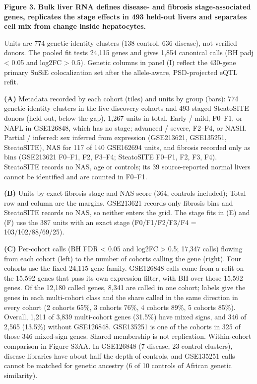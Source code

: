 \textbf{Figure 3. Bulk liver RNA defines disease- and fibrosis stage-associated genes, replicates the stage effects in 493 held-out livers and separates cell mix from change inside hepatocytes.}

Units are 774 genetic-identity clusters (138 control, 636 disease), not verified donors. The pooled fit tests 24,115 genes and gives 1,854 canonical calls (BH padj \textless{} 0.05 and \textbar log2FC\textbar{} \textgreater{} 0.5). Genetic columns in panel (I) reflect the 430-gene primary SuSiE colocalization set after the allele-aware, PSD-projected eQTL refit.

\textbf{(A)} Metadata recorded by each cohort (tiles) and units by group (bars): 774 genetic-identity clusters in the five discovery cohorts and 493 staged SteatoSITE donors (held out, below the gap), 1,267 units in total. Early / mild, F0--F1, or NAFL in GSE126848, which has no stage; advanced / severe, F2--F4, or NASH. Partial / inferred: sex inferred from expression (GSE213621, GSE135251, SteatoSITE), NAS for 117 of 140 GSE162694 units, and fibrosis recorded only as bins (GSE213621 F0--F1, F2, F3--F4; SteatoSITE F0--F1, F2, F3, F4). SteatoSITE records no NAS, age or controls; its 39 source-reported normal livers cannot be identified and are counted in F0--F1.

\textbf{(B)} Units by exact fibrosis stage and NAS score (364, controls included); Total row and column are the margins. GSE213621 records only fibrosis bins and SteatoSITE records no NAS, so neither enters the grid. The stage fits in (E) and (F) use the 387 units with an exact stage (F0/F1/F2/F3/F4 = 103/102/88/69/25).

\textbf{(C)} Per-cohort calls (BH FDR \textless{} 0.05 and \textbar log2FC\textbar{} \textgreater{} 0.5; 17,347 calls) flowing from each cohort (left) to the number of cohorts calling the gene (right). Four cohorts use the fixed 24,115-gene family. GSE126848 calls come from a refit on the 15,592 genes that pass its own expression filter, with BH over those 15,592 genes. Of the 12,180 called genes, 8,341 are called in one cohort; labels give the genes in each multi-cohort class and the share called in the same direction in every cohort (2 cohorts 65\%, 3 cohorts 76\%, 4 cohorts 89\%, 5 cohorts 85\%). Overall, 1,211 of 3,839 multi-cohort genes (31.5\%) have mixed signs, and 346 of 2,565 (13.5\%) without GSE126848. GSE135251 is one of the cohorts in 325 of those 346 mixed-sign genes. Shared membership is not replication. Within-cohort comparison in Figure S3AA. In GSE126848 (7 disease, 23 control clusters), disease libraries have about half the depth of controls, and GSE135251 calls cannot be matched for genetic ancestry (6 of 10 controls of African genetic similarity).

